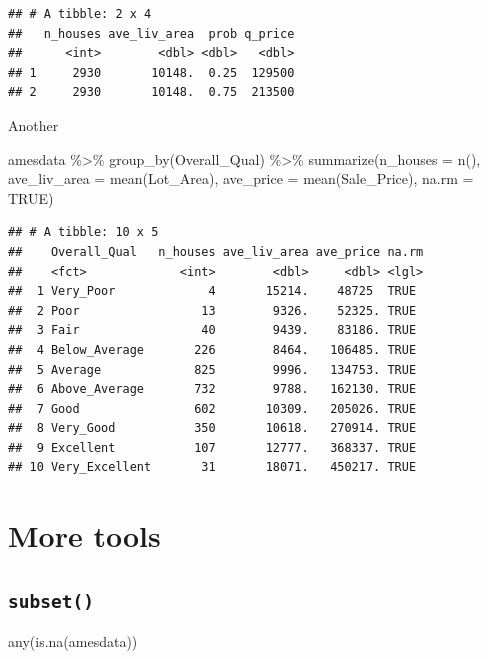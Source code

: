 \documentclass[
]{book}
\newenvironment{Shaded}{\begin{snugshade}}{\end{snugshade}}
\newcommand{\AttributeTok}[1]{\textcolor[rgb]{0.77,0.63,0.00}{#1}}
\newcommand{\ConstantTok}[1]{\textcolor[rgb]{0.00,0.00,0.00}{#1}}
\newcommand{\FunctionTok}[1]{\textcolor[rgb]{0.00,0.00,0.00}{#1}}
\newcommand{\NormalTok}[1]{#1}
\newcommand{\SpecialCharTok}[1]{\textcolor[rgb]{0.00,0.00,0.00}{#1}}
\begin{document}
\begin{verbatim}
## # A tibble: 2 x 4
##   n_houses ave_liv_area  prob q_price
##      <int>        <dbl> <dbl>   <dbl>
## 1     2930       10148.  0.25  129500
## 2     2930       10148.  0.75  213500
\end{verbatim}

Another

\begin{Shaded}
\begin{Highlighting}[]
\NormalTok{amesdata }\SpecialCharTok{\%\textgreater{}\%} 
  \FunctionTok{group\_by}\NormalTok{(Overall\_Qual) }\SpecialCharTok{\%\textgreater{}\%} 
  \FunctionTok{summarize}\NormalTok{(}\AttributeTok{n\_houses =} \FunctionTok{n}\NormalTok{(),}
            \AttributeTok{ave\_liv\_area =} \FunctionTok{mean}\NormalTok{(Lot\_Area),}
            \AttributeTok{ave\_price =} \FunctionTok{mean}\NormalTok{(Sale\_Price),}
            \AttributeTok{na.rm =} \ConstantTok{TRUE}\NormalTok{)}
\end{Highlighting}
\end{Shaded}

\begin{verbatim}
## # A tibble: 10 x 5
##    Overall_Qual   n_houses ave_liv_area ave_price na.rm
##    <fct>             <int>        <dbl>     <dbl> <lgl>
##  1 Very_Poor             4       15214.    48725  TRUE 
##  2 Poor                 13        9326.    52325. TRUE 
##  3 Fair                 40        9439.    83186. TRUE 
##  4 Below_Average       226        8464.   106485. TRUE 
##  5 Average             825        9996.   134753. TRUE 
##  6 Above_Average       732        9788.   162130. TRUE 
##  7 Good                602       10309.   205026. TRUE 
##  8 Very_Good           350       10618.   270914. TRUE 
##  9 Excellent           107       12777.   368337. TRUE 
## 10 Very_Excellent       31       18071.   450217. TRUE
\end{verbatim}

\hypertarget{more-tools}{%
\section{More tools}\label{more-tools}}

\hypertarget{subset}{%
\subsection{\texorpdfstring{\texttt{subset()}}{subset()}}\label{subset}}

\begin{Shaded}
\begin{Highlighting}[]
\FunctionTok{any}\NormalTok{(}\FunctionTok{is.na}\NormalTok{(amesdata))}
\end{Highlighting}
\end{Shaded}
\end{document}
